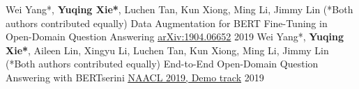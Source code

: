 

\begin{cventries}

\cventry
    {Wei Yang*, \textbf{Yuqing Xie*}, Luchen Tan, Kun Xiong, Ming Li, Jimmy Lin (*Both authors contributed equally)}
    {Data Augmentation for BERT Fine-Tuning in Open-Domain Question Answering} %
    {{\href{https://arxiv.org/abs/1904.06652}{\underline{arXiv:1904.06652}}}} %
    {2019} %
    {
    }
\cventry
    {Wei Yang*, \textbf{Yuqing Xie*}, Aileen Lin, Xingyu Li, Luchen Tan, Kun Xiong, Ming Li, Jimmy Lin (*Both authors contributed equally)}
    {End-to-End Open-Domain Question Answering with BERTserini} %
    {{\href{https://www.aclweb.org/anthology/N19-4013/}{\underline{NAACL 2019, Demo track}}}} %
    {2019} %
    {
    }

\end{cventries}
